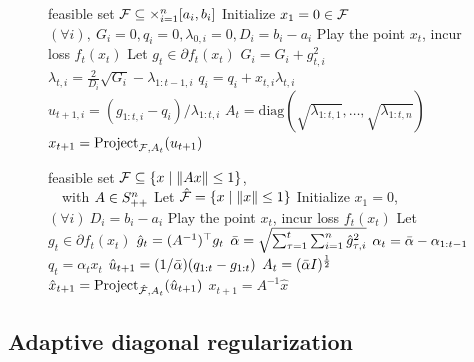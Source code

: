 \begin{figure}[ttt!]
 \begin{minipage}[t]{2.8in} \begin{algorithm}[H]
\caption{\FTPRLdiag} 
\label{alg:diag} 
\begin{algorithmic}
    feasible set $\mathcal{F} \subseteq \times_{i=1}^n [a_i, b_i]$
   \STATE Initialize $x_1 = 0 \in \mathcal{F}$
   \STATE $(\forall i),\ G_i = 0, q_i = 0, \lambda_{0,i} = 0, D_i = b_i - a_i$ 
   \STATE Play the point $x_t$, incur loss $f_t(x_t)$
   \STATE Let $g_t \in \partial f_t(x_t)$
     \STATE $G_i = G_i + g_{t,i}^2$
     \STATE $\lambda_{t,i} = \frac{2}{D_i}\sqrt{G_i} - \lambda_{1:t-1,i}$
     \STATE $q_i = q_i + x_{t,i}\lambda_{t,i}$
     \STATE $u_{t+1, i} = (g_{1:t,i} - q_i)/\lambda_{1:t,i}$
   \ENDFOR
   \STATE $A_t = \text{diag}(\sqrt{\lambda_{1:t,1}}, \dots, 
           \sqrt{\lambda_{1:t,n}})$
   \STATE $x_{t+1} = \text{Project}_{\mathcal{F}, A_t}(u_{t+1})$
   \ENDFOR
\end{algorithmic}
\end{algorithm}
\end{minipage}
\hfill
\begin{minipage}[t]{2.8in}
\begin{algorithm}[H]
\caption{\FTPRLscale} 
\label{alg:scale} 
\begin{algorithmic}
          feasible set $\mathcal{F} \subseteq \left\{x \mid \| A x \| \leq 1\right\}$, \\
   \STATE \ \ with $A \in S^n_{++}$
   \STATE Let $\hat{\mathcal{F}} = \left\{x \mid \| x \| \leq 1\right\}$
   \STATE Initialize $x_1 = 0$, $(\forall i)\ D_i = b_i - a_i$
   \STATE Play the point $x_t$, incur loss $f_t(x_t)$
   \STATE Let $g_t \in \partial f_t(x_t)$
   \STATE $\hat{g}_t = (A^{-1})^\top g_t$
   \STATE $\bar{\alpha} = \sqrt{\sum_{\tau=1}^t \sum_{i=1}^n \hat{g}_{\tau,i}^2}$
   \STATE $\alpha_t = \bar{\alpha} - \alpha_{1:t-1}$
   \STATE $q_t = \alpha_t  x_t$
   \STATE $\hat{u}_{t+1} = (1/\bar{\alpha})(q_{1:t} - g_{1:t})$
   \STATE $A_t = (\bar{\alpha} I)^\frac{1}{2}$
   \STATE $\hat{x}_{t+1} = \text{Project}_{\hat{\mathcal{F}}, A_t}(\hat{u}_{t+1})$
   \STATE $x_{t+1} = A^{-1}\hat{x}$
   \ENDFOR
\end{algorithmic}
\end{algorithm}
 \end{minipage}
 \hfill
\end{figure}




\subsection {Adaptive diagonal regularization}
\label{sec:per_coord_rate}


